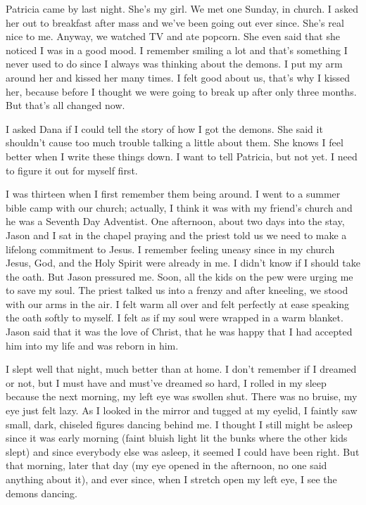 Patricia came by last night. She's my girl. We met one Sunday, in
church. I asked her out to breakfast after mass and we've been going out
ever since. She's real nice to me. Anyway, we watched TV and ate
popcorn. She even said that she noticed I was in a good mood. I remember
smiling a lot and that's something I never used to do since I always was
thinking about the demons. I put my arm around her and kissed her many
times. I felt good about us, that's why I kissed her, because before I
thought we were going to break up after only three months. But that's
all changed now.

I asked Dana if I could tell the story of how I got the demons. She said
it shouldn't cause too much trouble talking a little about them. She
knows I feel better when I write these things down. I want to tell
Patricia, but not yet. I need to figure it out for myself first.

I was thirteen when I first remember them being around. I went to a
summer bible camp with our church; actually, I think it was with my
friend's church and he was a Seventh Day Adventist. One afternoon, about
two days into the stay, Jason and I sat in the chapel praying and the
priest told us we need to make a lifelong commitment to Jesus. I
remember feeling uneasy since in my church Jesus, God, and the Holy
Spirit were already in me. I didn't know if I should take the oath. But
Jason pressured me. Soon, all the kids on the pew were urging me to save
my soul. The priest talked us into a frenzy and after kneeling, we stood
with our arms in the air. I felt warm all over and felt perfectly at
ease speaking the oath softly to myself. I felt as if my soul were
wrapped in a warm blanket. Jason said that it was the love of Christ,
that he was happy that I had accepted him into my life and was reborn in
him.

I slept well that night, much better than at home. I don't remember if I
dreamed or not, but I must have and must've dreamed so hard, I rolled in
my sleep because the next morning, my left eye was swollen shut. There
was no bruise, my eye just felt lazy. As I looked in the mirror and
tugged at my eyelid, I faintly saw small, dark, chiseled figures dancing
behind me. I thought I still might be asleep since it was early morning
(faint bluish light lit the bunks where the other kids slept) and since
everybody else was asleep, it seemed I could have been right. But that
morning, later that day (my eye opened in the afternoon, no one said
anything about it), and ever since, when I stretch open my left eye, I
see the demons dancing.

